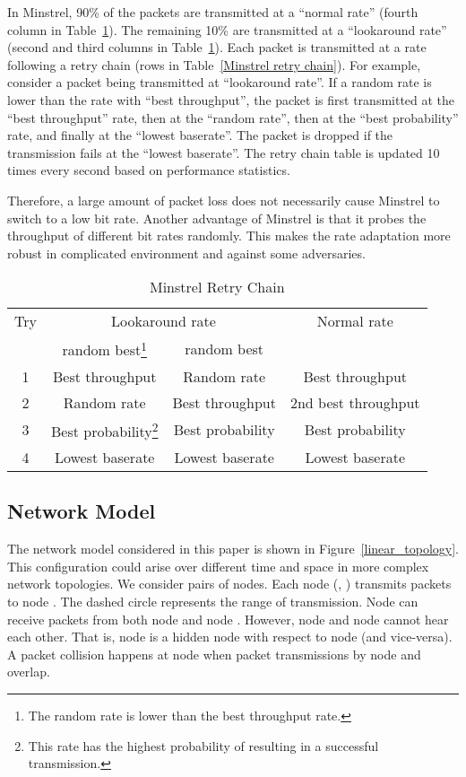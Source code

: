 \documentclass{IEEEtran}
\begin{document}
In Minstrel, 90\% of the packets are
transmitted at a ``normal rate'' (fourth column in Table~\ref{Minstrel retry chain}). The remaining 10\% are
transmitted at a ``lookaround rate'' (second and third columns in Table~\ref{Minstrel retry chain}). Each packet is transmitted at a
rate following a retry chain (rows in Table~\ref{Minstrel retry
  chain}). For example, consider a packet being transmitted at
``lookaround rate''. If a random rate is lower than the rate with ``best
throughput'', the packet is first transmitted at the
``best throughput'' rate, then at the ``random rate'', then at the ``best probability'' rate,
and finally at the ``lowest baserate''. The
packet is dropped if the transmission fails at the ``lowest
baserate''. The retry chain table is updated 10 times every second
based on performance statistics.

Therefore, a large amount of packet loss does not
necessarily cause Minstrel to switch to a low bit rate. Another advantage of
Minstrel is that it probes the throughput of different bit rates
randomly. This makes the rate adaptation more robust in complicated
environment and against some adversaries.


\begin{table}
\small
\centering
\caption{Minstrel Retry Chain \cite{Minstrel}}
\begin{tabular}{|c|c|c|c|} \hline \label{Minstrel retry chain}
Try & \multicolumn{2}{|c|}{Lookaround rate} & Normal rate \\
\cline{2-3}
    & random  best\footnote{The random rate is lower than the best throughput rate.} & random  best    & \\
\hline
1   & Best throughput  & Random rate      & Best throughput \\
\hline
2   & Random rate      & Best throughput  & 2nd best throughput \\
\hline
3   & Best probability\footnote{This rate has the highest probability of resulting in a successful transmission.} & Best probability & Best
probability \\
\hline
4   & Lowest baserate & Lowest baserate & Lowest baserate \\
\hline
\end{tabular}
\end{table}


\subsection{Network Model}
\label{Network Model}
The network model considered in this paper is shown in Figure~\ref{linear_topology}. This configuration could arise over different time and space
in
more complex network topologies. We consider
  pairs of nodes.  Each node  (, )
transmits packets to node . The dashed circle represents the
range of transmission. Node  can receive packets from both node
 and node . However, node  and node 
cannot hear each other. That is, node  is a hidden node with
respect to node  (and vice-versa). A packet collision happens at node
 when packet transmissions by node  and  overlap.
\end{document}
